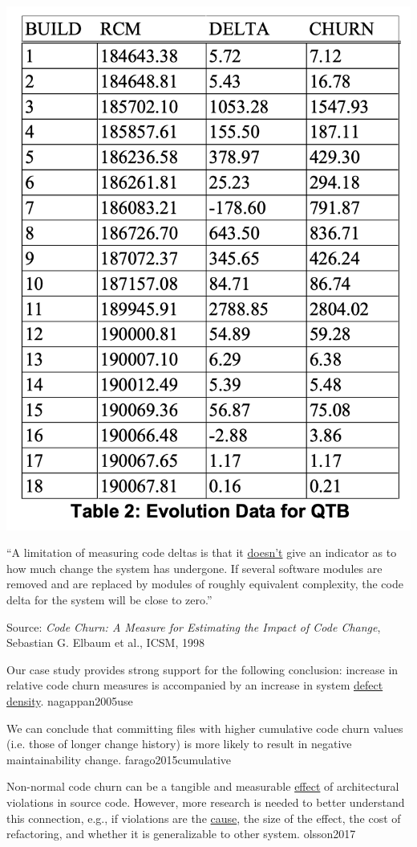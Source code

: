 \documentclass{article}
\begin{document}
\begin{multicols}{2}
\includegraphics[width=.7\columnwidth]{qtb.png}
\par\columnbreak\par
``A limitation of measuring code deltas is that it
\ul{doesn't} give an indicator as to how much change the
system has undergone. If several
software modules are removed and are replaced by
modules of roughly equivalent complexity, the code
delta for the system will be close to zero.''
\par
{\scriptsize Source: \textit{Code Churn: A Measure for Estimating the Impact of Code Change}, Sebastian G. Elbaum et al., ICSM, 1998\par}
\end{multicols}
\plush{}

  {Our case study provides strong support for the following conclusion: increase in relative code churn measures is accompanied by an increase in system \ul{defect density}.}
  {nagappan2005use}

  {We can conclude that committing files with higher cumulative code churn values (i.e. those of longer change history) is more likely to result in negative maintainability change.}
  {farago2015cumulative}

  {Non-normal code churn can be a tangible and measurable \ul{effect} of architectural violations in source code. However, more research is needed to better understand this connection, e.g., if violations are the \ul{cause}, the size of the effect, the cost of refactoring, and whether it is generalizable to other system.}
  {olsson2017}
\end{document}
